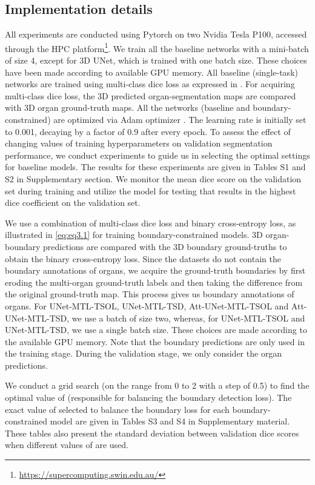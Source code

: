 \documentclass[final,5p,times,twocolumn]{elsarticle}
\begin{document}
\subsection{Implementation details}\label{sec:impl}
All experiments are conducted using Pytorch \cite{paszke2017automatic} on two Nvidia Tesla P100, accessed through the HPC platform\footnote{\url{https://supercomputing.swin.edu.au/}}. We train all the baseline networks with a mini-batch of size 4, except for 3D UNet, which is trained with one batch size. These choices have been made according to available GPU memory. All baseline (single-task) networks are trained using multi-class dice loss as expressed in . For acquiring multi-class dice loss, the 3D predicted organ-segmentation maps are compared with 3D organ ground-truth maps. All the networks (baseline and boundary-constrained) are optimized via Adam optimizer \cite{kingma2014adam}. The learning rate is initially set to 0.001, decaying by a factor of 0.9 after every epoch. To assess the effect of changing values of training hyperparameters on validation segmentation performance, we conduct experiments to guide us in selecting the optimal settings for baseline models. The results for these experiments are given in Tables S1 and S2 in Supplementary section. We monitor the mean dice score on the validation set during training and utilize the model for testing that results in the highest dice coefficient on the validation set. 

We use a combination of multi-class dice loss and binary cross-entropy loss, as illustrated in \autoref{eq:eq3.1} for training boundary-constrained models. 3D organ-boundary predictions are compared with the 3D boundary ground-truths to obtain the binary cross-entropy loss. Since the datasets do not contain the boundary annotations of organs, we acquire the ground-truth boundaries by first eroding the multi-organ ground-truth labels and then taking the difference from the original ground-truth map. This process gives us boundary annotations of organs. For UNet-MTL-TSOL, UNet-MTL-TSD, Att-UNet-MTL-TSOL and Att-UNet-MTL-TSD, we use a batch of size two, whereas, for UNet-MTL-TSOL and UNet-MTL-TSD, we use a single batch size. These choices are made according to the available GPU memory. Note that the boundary predictions are only used in the training stage. During the validation stage, we only consider the organ predictions. 

We conduct a grid search (on the range from 0 to 2 with a step of 0.5) to find the optimal value of  (responsible for balancing the boundary detection loss). The exact value of  selected to balance the boundary loss for each boundary-constrained model are given in Tables S3 and S4 in Supplementary material. These tables also present the standard deviation between validation dice scores when different values of  are used. 
\end{document}
